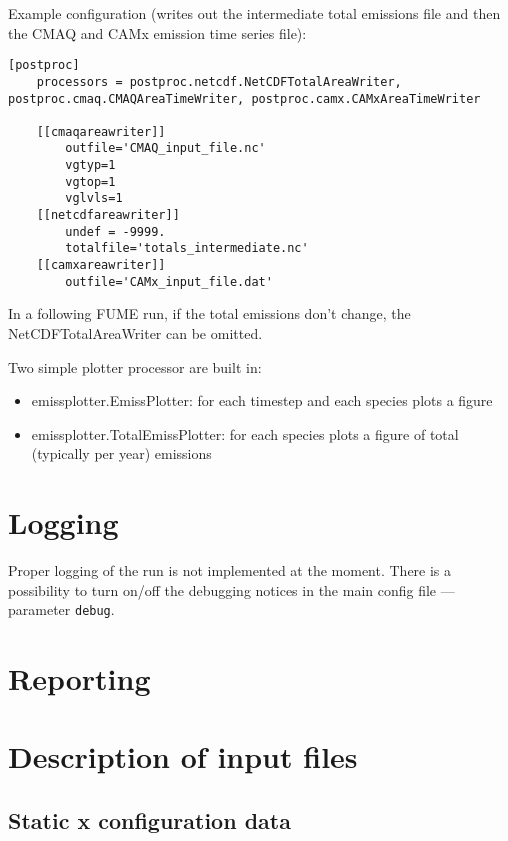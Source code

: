 \documentclass[a4paper,11pt]{article}
\begin{document}
Example configuration (writes out the intermediate total emissions file
and then the CMAQ and CAMx emission time series file):

\begin{verbatim}
[postproc]
    processors = postproc.netcdf.NetCDFTotalAreaWriter, postproc.cmaq.CMAQAreaTimeWriter, postproc.camx.CAMxAreaTimeWriter

    [[cmaqareawriter]]
        outfile='CMAQ_input_file.nc'
        vgtyp=1
        vgtop=1
        vglvls=1
    [[netcdfareawriter]]
        undef = -9999.
        totalfile='totals_intermediate.nc'
    [[camxareawriter]]
        outfile='CAMx_input_file.dat'
\end{verbatim}

In a following FUME run, if the total emissions don't change, the
NetCDFTotalAreaWriter can be omitted.

Two simple plotter processor are built in:

\begin{itemize}
\item
  emissplotter.EmissPlotter: for each timestep and each species plots a
  figure
\item
  emissplotter.TotalEmissPlotter: for each species plots a figure of
  total (typically per year) emissions
\end{itemize}

\section{Logging}\label{logging}
Proper logging of the run is not implemented at the moment. There is a possibility to turn on/off the debugging notices in the main config file --- parameter \verb|debug|. 

\section{Reporting}\label{reporting}



\newpage
\appendix 

\section{Description of input files}\label{description-of-input-files}

\subsection{Static x configuration data}\label{static-x-configuration-data}
\end{document}
